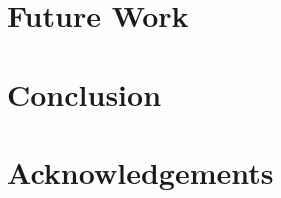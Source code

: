 \documentclass[10pt,twocolumn]{article}
\begin{document}
\section{Future Work}

\section{Conclusion}

\section{Acknowledgements}


{}

\end{document}
